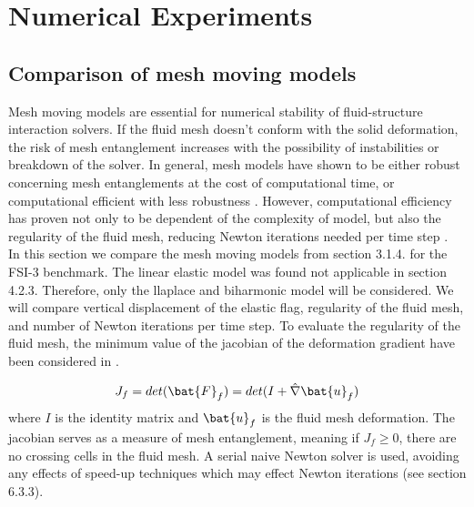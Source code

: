 

 \chapter{Numerical Experiments}

\section{Comparison of mesh moving models}
Mesh moving models are essential for numerical stability of fluid-structure interaction solvers. If the fluid mesh doesn't conform with the solid deformation, the risk of mesh entanglement increases with the possibility of instabilities or breakdown of the solver. In general, mesh models have shown to be either robust concerning mesh entanglements at the cost of computational time, or computational efficient with less robustness \cite{MM2016}. However, computational efficiency has proven not only to be dependent of the complexity of model, but also the regularity of the fluid mesh, reducing Newton iterations needed per time step \cite{Wickb}. \\ In this section we compare the mesh moving models from section 3.1.4. for the FSI-3 benchmark. The linear elastic model was found not applicable in section 4.2.3. Therefore, only the llaplace and biharmonic model will be considered. We will compare vertical displacement of the elastic flag, regularity of the fluid mesh, and number of Newton iterations per time step. To evaluate the regularity of the fluid mesh, the minimum value of the jacobian of the deformation gradient have been considered in \cite{Wickb}. 

\begin{align*}
{J}_f = det(\bat{F}_f) =  det(I + \hat{\nabla} \bat{u}_f)
\end{align*}
where $I$ is the identity matrix and $ \bat{u}_f$ is the fluid mesh deformation. The jacobian serves as a measure of mesh entanglement, meaning if $J_f \geq 0$, there are no crossing cells in the fluid mesh.  A serial naive Newton solver is used, avoiding any effects of speed-up techniques which may effect Newton iterations (see section 6.3.3). 

